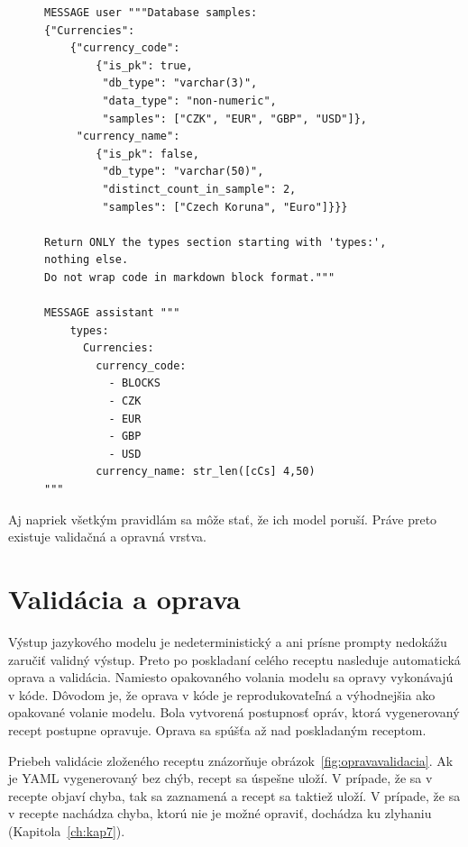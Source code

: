 \begin{figure}[H]
    \centering
    \begin{lstlisting}[caption={Príklad BLOCKS few-shot správy}, label={lst:fewshot_example}, frame=single, linewidth=0.95\textwidth, xleftmargin=0.05\textwidth]
MESSAGE user """Database samples:
{"Currencies": 
    {"currency_code": 
        {"is_pk": true, 
         "db_type": "varchar(3)", 
         "data_type": "non-numeric", 
         "samples": ["CZK", "EUR", "GBP", "USD"]}, 
     "currency_name": 
        {"is_pk": false, 
         "db_type": "varchar(50)", 
         "distinct_count_in_sample": 2, 
         "samples": ["Czech Koruna", "Euro"]}}}

Return ONLY the types section starting with 'types:', nothing else. 
Do not wrap code in markdown block format."""

MESSAGE assistant """
    types:
      Currencies:
        currency_code:
          - BLOCKS
          - CZK
          - EUR
          - GBP
          - USD
        currency_name: str_len([cCs] 4,50)
"""

\end{lstlisting}

\end{figure}

Aj napriek všetkým pravidlám sa môže stať, že ich model poruší. Práve preto existuje validačná a opravná vrstva.

\section{Validácia a oprava}
\label{sub:validacia_oprava}

Výstup jazykového modelu je nedeterministický a ani prísne prompty nedokážu zaručiť validný výstup. Preto po poskladaní celého receptu nasleduje automatická oprava a validácia. Namiesto opakovaného volania modelu sa opravy vykonávajú v kóde. Dôvodom je, že oprava v kóde je reprodukovateľná a výhodnejšia ako opakované volanie modelu. Bola vytvorená postupnosť opráv, ktorá vygenerovaný recept postupne opravuje. Oprava sa spúšťa až nad poskladaným receptom.

Priebeh validácie zloženého receptu znázorňuje obrázok~\ref{fig:opravavalidacia}. Ak je YAML vygenerovaný bez chýb, recept sa úspešne uloží. V prípade, že sa v recepte objaví chyba, tak sa zaznamená a recept sa taktiež uloží. V prípade, že sa v recepte nachádza chyba, ktorú nie je možné opraviť, dochádza ku zlyhaniu (Kapitola~\ref{ch:kap7}).


